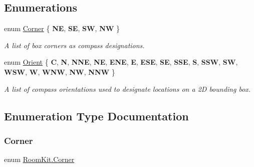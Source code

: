 \subsection*{Enumerations}
\begin{DoxyCompactItemize}
\item 
enum \mbox{\hyperlink{namespace_room_kit_ad179e5d89fb3a10af01750dfa2f8e852}{Corner}} \{ {\bfseries NE}, 
{\bfseries SE}, 
{\bfseries SW}, 
{\bfseries NW}
 \}
\begin{DoxyCompactList}\small\item\em A list of box corners as compass designations. \end{DoxyCompactList}\item 
enum \mbox{\hyperlink{namespace_room_kit_a46927f752f7751de2c23e9e644fb508d}{Orient}} \{ \newline
{\bfseries C}, 
{\bfseries N}, 
{\bfseries N\+NE}, 
{\bfseries NE}, 
\newline
{\bfseries E\+NE}, 
{\bfseries E}, 
{\bfseries E\+SE}, 
{\bfseries SE}, 
\newline
{\bfseries S\+SE}, 
{\bfseries S}, 
{\bfseries S\+SW}, 
{\bfseries SW}, 
\newline
{\bfseries W\+SW}, 
{\bfseries W}, 
{\bfseries W\+NW}, 
{\bfseries NW}, 
\newline
{\bfseries N\+NW}
 \}
\begin{DoxyCompactList}\small\item\em A list of compass orientations used to designate locations on a 2D bounding box. \end{DoxyCompactList}\end{DoxyCompactItemize}


\subsection{Enumeration Type Documentation}
\mbox{\label{namespace_room_kit_ad179e5d89fb3a10af01750dfa2f8e852}} 
\subsubsection{\texorpdfstring{Corner}{Corner}}
{\footnotesize\ttfamily enum \mbox{\hyperlink{namespace_room_kit_ad179e5d89fb3a10af01750dfa2f8e852}{Room\+Kit.\+Corner}}\hspace{0.3cm}{\ttfamily [strong]}}




